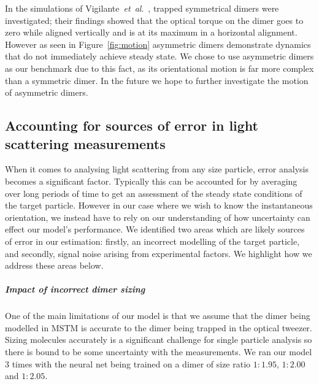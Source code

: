 \documentclass[final,  3p]{elsarticle}
\begin{document}
In the simulations of Vigilante~\emph{et~al}.\ \cite{Vigilante2020Brownian_OT}, trapped symmetrical dimers were investigated; their findings showed that the optical torque on the dimer goes to zero while aligned vertically and is at its maximum in a horizontal alignment. However as seen in Figure~\ref{fig:motion} asymmetric dimers demonstrate dynamics that do not immediately achieve steady state. We chose to use asymmetric dimers as our benchmark due to this fact, as its orientational motion is far more complex than a symmetric dimer. In the future we hope to further investigate the motion of asymmetric dimers. 
\subsection{Accounting for sources of error in light scattering measurements}
When it comes to analysing light scattering from any size particle, error analysis becomes a significant factor. Typically this can be accounted for by averaging over long periods of time to get an assessment of the steady state conditions of the target particle. However in our case where we wish to know the instantaneous orientation, we instead have to rely on our understanding of how uncertainty can effect our model's performance. We identified two areas which are likely sources of error in our estimation: firstly, an incorrect modelling of the target particle, and secondly, signal noise arising from experimental factors. We highlight how we address these areas below. 
\subparagraph{Impact of incorrect dimer sizing}
\label{sec:lam}

One of the main limitations of our model is that we assume that the dimer being modelled in MSTM is accurate to the dimer being trapped in the optical tweezer. Sizing molecules accurately is a significant challenge for single particle analysis so there is bound to be some uncertainty with the measurements. We ran our model 3 times with the neural net being trained on a dimer of size ratio $1:1.95$, $1:2.00$ and $1:2.05$.
\end{document}
